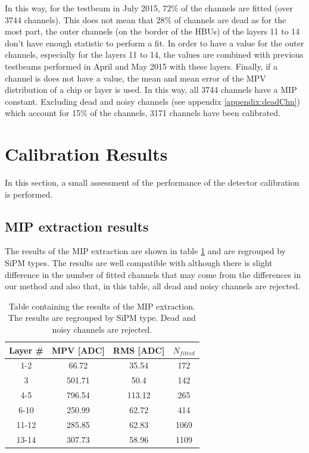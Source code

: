 In this way, for the testbeam in July 2015, 72\% of the channels are fitted (over 3744 channels). This does not mean that 28\% of channels are dead as for the most part, the outer channels (on the border of the HBUs) of the layers 11 to 14 don't have enough statistic to perform a fit. In order to have a value for the outer channels, especially for the layers 11 to 14, the values are combined with previous testbeams performed in April and May 2015 with these layers. Finally, if a channel is does not have a value, the mean and mean error of the MPV distribution of a chip or layer is used. In this way, all 3744 channels have a MIP constant. Excluding dead and noisy channels (see appendix \ref{appendix:deadChn}) which account for 15\% of the channels, 3171 channels have been calibrated.

\section{Calibration Results}

In this section, a small assessment of the performance of the detector calibration is performed.

\subsection{MIP extraction results}

The results of the MIP extraction are shown in table \ref{table:MIPAHCAL} and are regrouped by SiPM types. The results are well compatible with \cite{SarahMaster} although there is slight difference in the number of fitted channels that may come from the differences in our method and also that, in this table, all dead and noisy channels are rejected.

\begin{table}[htb!]
	\centering
	\caption{Table containing the results of the MIP extraction. The results are regrouped by SiPM type. Dead and noisy channels are rejected.}
	\label{table:MIPAHCAL}
	\begin{tabular}{@{} cccc @{}}
		\hline
		Layer \# & MPV [ADC] & RMS [ADC] & $N_{fitted}$\\
		\hline
		\hline
		1-2 & 66.72 & 35.54 & 172\\
		3 & 501.71 & 50.4 & 142\\
		4-5 & 796.54 & 113.12 & 265\\
		6-10 & 250.99 & 62.72 & 414\\
		11-12 & 285.85 & 62.83 & 1069\\
		13-14 & 307.73 & 58.96 & 1109\\
		\hline
	\end{tabular}
\end{table}

